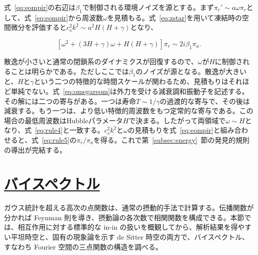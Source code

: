 \documentclass[a4paper,11pt]{ltjsarticle}
\newcommand{\sectionlink}[1]{\section[#1]{\hyperlink{toc}{#1}}}
\numberwithin{equation}{section}
\def\pia{\pi_{a}}
\def\pir{\pi_{r}}
\newcommand{\Eq}[1]{Eq.~(\ref{#1})}
\newcommand{\Sec}[1]{Sec.~\ref{#1}}
\renewcommand{\Eq}[1]{式~\eqref{#1}}
\renewcommand{\Sec}[1]{第~\ref{#1}~節}
\begin{document}
\Eq{eq:eompir}の右辺は$\beta_1$で制御される環境ノイズを源とする。まず$\pi_r'\sim a\omega\pi_r$として、\Eq{eq:eompir}から周波数$\omega$を見積もる。\Eq{eq:zstar}を用いて凍結時の空間微分を評価すると$c_s^2k^2\sim a^2H(H+\gamma)$となり、

\begin{equation}\label{eq:omegareom}
    \left[\omega^{2}+\left(3H+\gamma\right)\omega+H\left(H+\gamma\right)\right] \pir \sim 2i\beta_{1}\pia.
\end{equation}

散逸が小さいと通常の閉鎖系のダイナミクスが回復するので、$\omega$が$H$に制御されることは明らかである。ただしここでは$\beta_1$のノイズが源となる。散逸が大きいと、$H$と$\gamma$という二つの特徴的な時間スケールが関わるため、見積もりはそれほど単純でない。\Eq{eq:omegareom}は外力を受ける減衰調和振動子を記述する。その解には二つの寄与がある。一つは寿命$T\sim1/\gamma$の過渡的な寄与で、その後は減衰する。もう一つは、より低い特徴的周波数をもつ定常的な寄与である。この場合の最低周波数はHubbleパラメータ$H$で決まる。したがって両領域で$\omega\sim H$となり、\Eq{eq:rule4}と一致する。$c_s^2k^2$と$\omega$の見積もりを\Eq{eq:eompir}と組み合わせると、\Eq{eq:rule5}の$\pir/\pia$を得る。これで\Sec{subsec:energy}の発見的規則の導出が完結する。

\sectionlink{バイスペクトル}\label{sec:bispec}

ガウス統計を超える高次の点関数は、通常の摂動的手法で計算する。伝播関数が分かれば Feynman 則を導き、摂動論の各次数で相関関数を構成できる。本節では、相互作用に対する標準的な in-in の扱いを概観してから、解析結果を得やすい平坦時空と、固有の現象論を示す de Sitter 時空の両方で、バイスペクトル、すなわち Fourier 空間の三点関数の構造を調べる。
\end{document}
